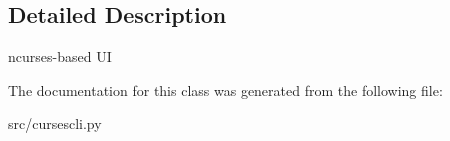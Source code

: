 \subsection{Detailed Description}
\begin{DoxyVerb}ncurses-based UI \end{DoxyVerb}
 

The documentation for this class was generated from the following file\+:\begin{DoxyCompactItemize}
\item 
src/cursescli.\+py\end{DoxyCompactItemize}

